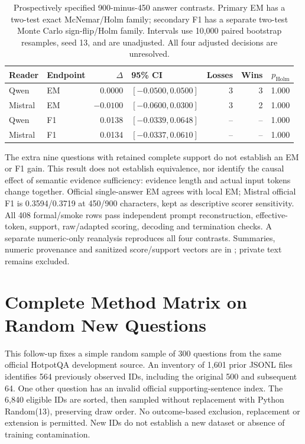 \begin{table}[htbp]
\centering\footnotesize
\caption{Prospectively specified 900-minus-450 answer contrasts. Primary EM has a two-test exact McNemar/Holm family; secondary F1 has a separate two-test Monte Carlo sign-flip/Holm family. Intervals use 10,000 paired bootstrap resamples, seed 13, and are unadjusted. All four adjusted decisions are unresolved.}
\label{tab:followup_serializer_pairs}
\begin{tabularx}{\textwidth}{l l r l r r r}
\toprule
Reader & Endpoint & $\Delta$ & 95\% CI & Losses & Wins & $p_{\mathrm{Holm}}$ \\
\midrule
Qwen & EM & 0.0000 & $[-0.0500,0.0500]$ & 3 & 3 & 1.000 \\
Mistral & EM & $-0.0100$ & $[-0.0600,0.0300]$ & 3 & 2 & 1.000 \\
Qwen & F1 & 0.0138 & $[-0.0339,0.0648]$ & -- & -- & 1.000 \\
Mistral & F1 & 0.0134 & $[-0.0337,0.0610]$ & -- & -- & 1.000 \\
\bottomrule
\end{tabularx}
\end{table}

The extra nine questions with retained complete support do not establish an EM or F1 gain. This result does not establish equivalence, nor identify the causal effect of semantic evidence sufficiency: evidence length and actual input tokens change together. Official single-answer EM agrees with local EM; Mistral official F1 is 0.3594/0.3719 at 450/900 characters, kept as descriptive scorer sensitivity. All 408 formal/smoke rows pass independent prompt reconstruction, effective-token, support, raw/adapted scoring, decoding and termination checks. A separate numeric-only reanalysis reproduces all four contrasts. Summaries, numeric provenance and sanitized score/support vectors are in ; private text remains excluded.

\FloatBarrier
\section{Complete Method Matrix on Random New Questions}
\label{sec:supp_followup_holdout}

This follow-up fixes a simple random sample of 300 questions from the same official HotpotQA development source. An inventory of 1,601 prior JSONL files identifies 564 previously observed IDs, including the original 500 and subsequent 64. One other question has an invalid official supporting-sentence index. The 6,840 eligible IDs are sorted, then sampled without replacement with Python Random(13), preserving draw order. No outcome-based exclusion, replacement or extension is permitted. New IDs do not establish a new dataset or absence of training contamination.

